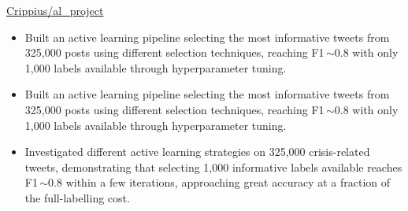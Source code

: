 {}
{
}
{\href{https://github.com/Crippius/al_project}
{Crippius/al\_project}}
\begin{itemize}

    \ifde
        \item Built an active learning pipeline selecting the most informative tweets from 325,000 posts using different selection techniques, reaching F1\,$\sim$0.8 with only 1,000 labels available through hyperparameter tuning.
    \else
        \ifhpc
            \item Built an active learning pipeline selecting the most informative tweets from 325,000 posts using different selection techniques, reaching F1\,$\sim$0.8 with only 1,000 labels available through hyperparameter tuning.
        \else
            \item Investigated different active learning strategies on 325,000 crisis-related tweets, demonstrating that selecting 1,000 informative labels available reaches F1\,$\sim$0.8 within a few iterations, approaching great accuracy at a fraction of the full-labelling cost.
        \fi
    \fi

\end{itemize}

\medskip
